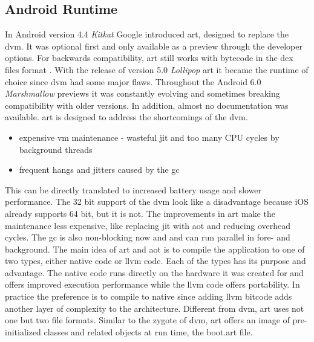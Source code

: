\subsection{Android Runtime} \label{subsection:android-art}
In Android version 4.4 \textit{Kitkat} Google introduced \gls{art}, designed to replace the \gls{dvm}.
It was optional first and only available as a preview through the developer options.
\newline
For backwards compatibility, \gls{art} still works with bytecode in the \gls{dex} files format \cite{androidArt}.
With the release of version 5.0 \textit{Lollipop} \gls{art} it became the runtime of choice since \gls{dvm} had some major flaws.
Throughout the Android 6.0 \textit{Marshmallow} previews it was constantly evolving and sometimes breaking compatibility with older versions.
In addition, almost no documentation was available.
\newline
\gls{art} is designed to address the shortcomings of the \gls{dvm}.
\begin{itemize}
\item expensive \gls{vm} maintenance - wasteful \gls{jit} and too many CPU cycles by background threads
\item frequent hangs and jitters caused by the \gls{gc}
\end{itemize}
This can be directly translated to increased battery usage and slower performance.
The 32 bit support of the \gls{dvm} look like a disadvantage because iOS already supports 64 bit, but it is not.
\newline
The improvements in \gls{art} make the maintenance less expensive, like replacing \gls{jit} with \gls{aot} and reducing overhead cycles.
The \gls{gc} is also non-blocking now and and can run parallel in fore- and background.
\newline
The main idea of \gls{art} and \gls{aot} is to compile the application to one of two types, either native code or \gls{llvm} code.
Each of the types has its purpose and advantage.
The native code runs directly on the hardware it was created for and offers improved execution performance while the \gls{llvm} code offers portability.
In practice the preference is to compile to native since adding \gls{llvm} bitcode adds another layer of complexity to the architecture.
\newline
Different from \gls{dvm}, \gls{art} uses not one but two file formats.
Similar to the zygote of \gls{dvm}, \gls{art} offers an image of pre-initialized classes and related objects at run time, the boot.art file.
